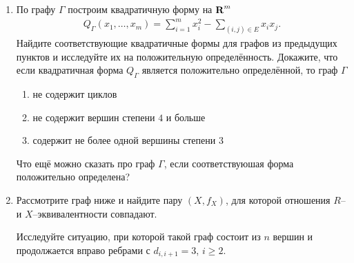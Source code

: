 \begin{enumerate}
\begin{enumerate}
\begin{center}
\end{center}
\end{enumerate}

\item По графу $\Gamma$ построим квадратичную форму на $\text{\bf R}^m$
\begin{align*}
Q_\Gamma(x_1, \ldots, x_m) = \sum_{i=1}^m x_i^2 - \sum_{(i,j)\in E} x_i x_j.
\end{align*}
Найдите соответствующие квадратичные формы для графов из предыдущих пунктов и исследуйте их на положительную определённость. Докажите, что если квадратичная форма $Q_\Gamma$ является положительно определённой, то граф $\Gamma$
\begin{enumerate}
\item не содержит циклов
\item не содержит вершин степени $4$ и больше
\item содержит не более одной вершины степени $3$
\end{enumerate}
Что ещё можно сказать про граф $\Gamma$, если соответствуюшая форма положительно определена?
\item Рассмотрите граф ниже и найдите пару $(X,f_X)$, для которой отношения $R$-- и $X$--эквивалентности совпадают.
\begin{center}
\end{center}
Исследуйте ситуацию, при которой такой граф состоит из $n$ вершин и продолжается вправо ребрами с $d_{i,i+1} = 3$, $i \geq 2$.
\end{enumerate}